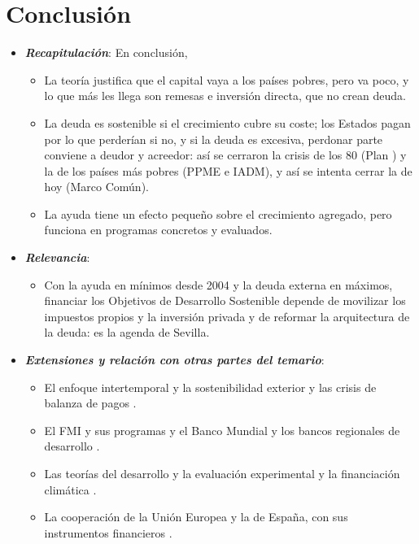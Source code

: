 \documentclass[11pt]{article}
\begin{document}
\section*{Conclusión}

\begin{itemize}
\item \textbf{\emph{Recapitulación}}: En conclusión,
  \begin{itemize}
  \item La teoría justifica que el capital vaya a los países pobres, pero va poco, y lo que más les llega son remesas e inversión directa, que no crean deuda.
  \item La deuda es sostenible si el crecimiento cubre su coste; los Estados pagan por lo que perderían si no, y si la deuda es excesiva, perdonar parte conviene a deudor y acreedor: así se cerraron la crisis de los 80 (Plan ) y la de los países más pobres (PPME e IADM), y así se intenta cerrar la de hoy (Marco Común).
  \item La ayuda tiene un efecto pequeño sobre el crecimiento agregado, pero funciona en programas concretos y evaluados.
  \end{itemize}
\item \textbf{\emph{Relevancia}}:
  \begin{itemize}
  \item Con la ayuda en mínimos desde 2004 y la deuda externa en máximos, financiar los Objetivos de Desarrollo Sostenible depende de movilizar los impuestos propios y la inversión privada y de reformar la arquitectura de la deuda: es la agenda de Sevilla.
  \end{itemize}
\item \textbf{\emph{Extensiones y relación con otras partes del temario}}:
  \begin{itemize}
  \item El enfoque intertemporal y la sostenibilidad exterior  y las crisis de balanza de pagos .
  \item El FMI y sus programas  y el Banco Mundial y los bancos regionales de desarrollo .
  \item Las teorías del desarrollo y la evaluación experimental  y la financiación climática .
  \item La cooperación de la Unión Europea  y la de España, con sus instrumentos financieros  .

\end{itemize}
\end{itemize}
\end{document}
